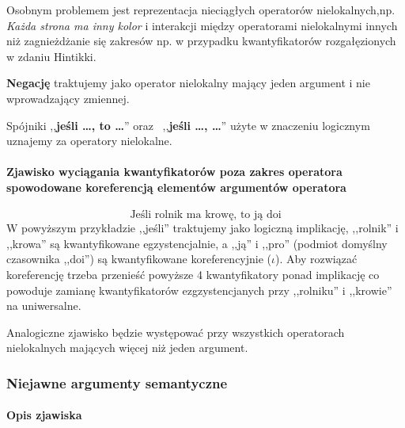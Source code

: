 \documentclass[12pt]{mwart}
\theoremstyle{remark}
\begin{document}
Osobnym problemem jest reprezentacja nieciągłych operatorów nielokalnych,np. \emph{Każda strona ma inny kolor} i interakcji między operatorami nielokalnymi innych niż zagnieżdżanie się zakresów
np. w przypadku kwantyfikatorów rozgałęzionych w zdaniu Hintikki.

\textbf{Negację} traktujemy jako operator nielokalny mający jeden argument i nie wprowadzający zmiennej.

Spójniki ,,\textbf{jeśli \dots, to \dots}'' oraz~ ,,\textbf{jeśli \dots, \dots}'' użyte w znaczeniu logicznym uznajemy za operatory nielokalne.



\paragraph{Zjawisko wyciągania kwantyfikatorów poza zakres operatora spowodowane koreferencją elementów argumentów operatora}
\begin{equation}
	\text{Jeśli rolnik ma krowę, to ją doi}
\end{equation}
W powyższym przykładzie ,,jeśli'' traktujemy jako logiczną implikację, ,,rolnik'' i ,,krowa'' są kwantyfikowane egzystencjalnie, a 
,,ją'' i ,,pro'' (podmiot domyślny czasownika ,,doi'') są kwantyfikowane koreferencyjnie ($\iota$). 
Aby rozwiązać koreferencję trzeba przenieść powyższe 4 kwantyfikatory ponad implikację co powoduje
zamianę kwantyfikatorów  ezgzystencjanych przy ,,rolniku'' i ,,krowie'' na uniwersalne. 

Analogiczne zjawisko będzie występować przy wszystkich operatorach nielokalnych mających więcej niż jeden argument.

\subsubsection{Niejawne argumenty semantyczne} %
\paragraph{Opis zjawiska} %
\label{sub:definicja_robocza2}
\end{document}
